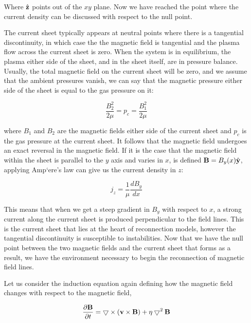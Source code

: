 \noindent Where $\hat{\mathbf{z}}$ points out of the $xy$ plane.
Now we have reached the point where the current density can be discussed with respect to the null point.

The current sheet typically appears at neutral points where there is a tangential discontinuity, in which case the the magnetic field is tangential and the plasma flow across the current sheet is zero.
When the system is in equilibrium, the plasma either side of the sheet, and in the sheet itself, are in pressure balance.
Usually, the total magnetic field on the current sheet will be zero, and we assume that the ambient pressures vanish, we can say that the magnetic pressure either side of the sheet is equal to the gas pressure on it:

\begin{equation}
	\frac{B_2^2}{2\mu} = p_c = \frac{B_1^2}{2\mu}
\end{equation}

\noindent where $B_1$ and $B_2$ are the magnetic fields either side of the current sheet and $p_c$ is the gas pressure at the current sheet.
It follows that the magnetic field undergoes an exact reversal in the magnetic field.
If it is the case that the magnetic field within the sheet is parallel to the $y$ axis and varies in $x$, is defined $\mathbf{B} = B_y(x)\hat{\mathbf{y}}$, applying Amp{`e}re's law can give us the current density in $z$:

\begin{equation}
	j_z = \frac{1}{\mu}\frac{dB_y}{dx}
\end{equation}

\noindent This means that when we get a steep gradient in $B_y$ with respect to $x$, a strong current along the current sheet is produced perpendicular to the field lines.
This is the current sheet that lies at the heart of reconnection models, however the tangential discontinuity is susceptible to instabilities.
Now that we have the null point between the two magnetic fields and the current sheet that forms as a result, we have the environment necessary to begin the reconnection of magnetic field lines.

Let us consider the induction equation again defining how the magnetic field changes with respect to the magnetic field,

\begin{equation}
	\frac{\partial \mathbf{B}}{\partial t } = \bigtriangledown \times (\mathbf{v} \times \mathbf{B}) + \eta\bigtriangledown^2\mathbf{B}
\end{equation} 

